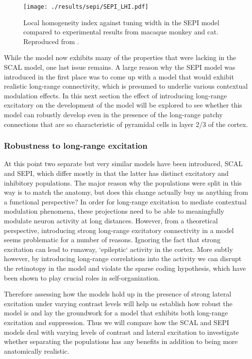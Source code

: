 \begin{figure}
	\centering
        \texttt{[image: ./results/sepi/SEPI\_LHI.pdf]}
	\caption{Local homogeneity index against tuning width in the SEPI
      model compared to experimental results from macaque monkey and
      cat. Reproduced from \cite{Nauhaus2008}.}
	\label{SEPILHI}
\end{figure}

While the model now exhibits many of the properties that were lacking
in the SCAL model, one last issue remains. A large reason why the SEPI
model was introduced in the first place was to come up with a model
that would exhibit realistic long-range connectivity, which is
presumed to underlie various contextual modulation effects. In this
next section the effect of introducing long-range excitatory on the
development of the model will be explored to see whether this model
can robustly develop even in the presence of the long-range patchy
connections that are so characteristic of pyramidal cells in layer 2/3
of the cortex.

\subsubsection{Robustness to long-range excitation}

At this point two separate but very similar models have been
introduced, SCAL and SEPI, which differ mostly in that the latter has
distinct excitatory and inhibitory populations. The major reason why
the populations were split in this way is to match the anatomy, but
does this change actually buy us anything from a functional
perspective? In order for long-range excitation to mediate contextual
modulation phenomena, these projections need to be able to
meaningfully modulate neuron activity at long distances. However, from
a theoretical perspective, introducing strong long-range excitatory
connectivity in a model seems problematic for a number of
reasons. Ignoring the fact that strong excitation can lead to runaway,
`epileptic` activity in the cortex. More subtly however, by
introducing long-range correlations into the activity we can disrupt
the retinotopy in the model and violate the sparse coding hypothesis,
which have been shown to play crucial roles in self-organization.

Therefore assessing how the models hold up in the presence of strong
lateral excitation under varying contrast levels will help us
establish how robust the model is and lay the groundwork for a model
that exhibits both long-range excitation and suppression. Thus we will
compare how the SCAL and SEPI models deal with varying levels of
contrast and lateral excitation to investigate whether separating the
populations has any benefits in addition to being more anatomically
realistic.

